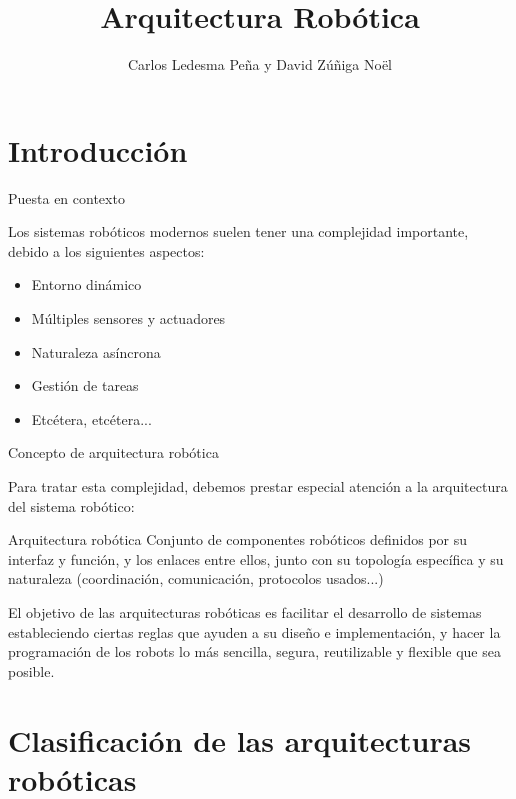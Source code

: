 \documentclass{beamer}
\title{Arquitectura Robótica}
\author{Carlos Ledesma Peña y David Zúñiga Noël}
\institute{Programación de Robots}
\date{}
\begin{document}
\begin{frame}
\titlepage
\end{frame}

\section{Introducción}

\begin{frame}{Puesta en contexto}

Los sistemas robóticos modernos suelen tener una complejidad importante, debido a los siguientes aspectos:

\begin{itemize}
	\item Entorno dinámico
	\item Múltiples sensores y actuadores
	\item Naturaleza asíncrona
	\item Gestión de tareas
	\item Etcétera, etcétera...
\end{itemize}

\end{frame}

\begin{frame}{Concepto de arquitectura robótica}

Para tratar esta complejidad, debemos prestar especial atención a la arquitectura del sistema robótico:

\begin{block}{Arquitectura robótica}
Conjunto de componentes robóticos definidos por su interfaz y función, y los enlaces entre ellos, junto con su topología específica y su naturaleza (coordinación, comunicación, protocolos usados...)
\end{block}

El objetivo de las arquitecturas robóticas es facilitar el desarrollo de sistemas estableciendo ciertas reglas que ayuden a su diseño e implementación, y hacer la programación de los robots lo más sencilla, segura, reutilizable y flexible que sea posible.

\end{frame}

\section{Clasificación de las arquitecturas robóticas}
\end{document}
